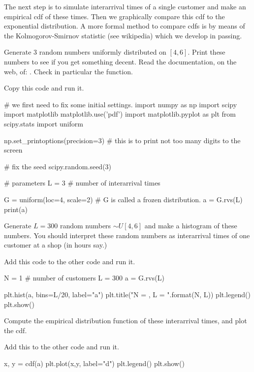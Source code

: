 \documentclass{scrartcl}
\begin{document}
The next step is to simulate interarrival times of a single customer and  make an empirical cdf of these times.  Then we graphically compare this cdf to the exponential distribution. A more formal method to compare cdfs is by means of the Kolmogorov-Smirnov statistic (see wikipedia) which we develop in passing.

\begin{exercise}
  Generate 3 random numbers uniformly distributed on $[4,6]$.  Print these numbers to see if you get something decent. Read the documentation, on the web, of:
 .  Check in particular the  function. 

\begin{solution}
Copy this code and run it.
\begin{pyverbatim}
# we first need to fix some initial settings.
import numpy as np
import scipy
import matplotlib
matplotlib.use('pdf') 
import matplotlib.pyplot as plt
from scipy.stats import uniform

np.set_printoptions(precision=3) # this is to print not too many digits to the screen

# fix the seed
scipy.random.seed(3) 

# parameters
L = 3  # number of interarrival times

G = uniform(loc=4, scale=2) # G is called a frozen distribution.
a = G.rvs(L)
print(a)
\end{pyverbatim}
  
\end{solution}

\end{exercise}


\begin{exercise}
Generate $L=300$ random numbers $\sim U[4,6]$ and make a histogram of these numbers. You should interpret these random numbers as interarrival times of one customer at a shop (in hours say.)
\begin{solution}
Add this code to the other code and run it.
\begin{pyverbatim}
N = 1 # number of customers
L = 300
a = G.rvs(L)

plt.hist(a, bins=L/20, label="a")
plt.title("N = {}, L = {}".format(N, L))
plt.legend()
plt.show()
\end{pyverbatim}
\end{solution}
\end{exercise}

\begin{exercise}
Compute  the empirical distribution function of these interarrival times, and plot the cdf.
\begin{solution}
Add this to the other code and run it.
\begin{pyverbatim}
x, y = cdf(a)
plt.plot(x,y,  label="d")
plt.legend()
plt.show()
\end{pyverbatim}
\end{solution}
\end{exercise}
\end{document}
